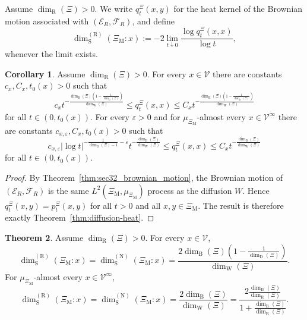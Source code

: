 \documentclass{article}
\theoremstyle{plain}
\theoremstyle{definition}
\newtheorem{theorem}{Theorem}[section]
\newtheorem{corollary}[theorem]{Corollary}
\newcommand{\dimbox}{\dim_\mathrm{B}}
\newcommand{\dimdeg}{\dim_\mathrm{D}}
\newcommand{\dimwalk}{\dim_\mathrm{W}}
\newcommand{\dimresis}{\dim_\mathrm{R}}
\newcommand{\dimspec}{\dim_\mathrm{S}}
\begin{document}

\bigskip 

Assume $\dimresis(\Xi)>0$.
We write $q_t^\Xi(x,y)$ for the heat kernel of the Brownian motion associated with $(\mathcal E_R,\mathcal F_R)$, and define
\[
\dimspec^{(\mathrm R)}(\Xi_{\mathrm M}:x)
:=
-2 \lim_{t \downarrow 0} \frac{\log q_t^\Xi(x,x)}{\log t},
\]
whenever the limit exists.

\begin{corollary}\label{cor:brownian-heat}
Assume $\dimresis(\Xi)>0$.
For every $x\in \mathscr V$ there are constants $c_x,C_x,t_0(x)>0$ such that
\[
c_x t^{-\frac{\dimbox(\Xi)\left(1-\frac{1}{\dimdeg(\Xi)}\right)}{\dimwalk(\Xi)}}
\le
q_t^\Xi(x,x)
\le
C_x t^{-\frac{\dimbox(\Xi)\left(1-\frac{1}{\dimdeg(\Xi)}\right)}{\dimwalk(\Xi)}}
\]
for all $t\in(0,t_0(x))$.
For every $\varepsilon>0$ and for $\mu_{\Xi_{\mathrm M}}$-almost every $x\in \mathscr V^\infty$ there are constants $c_{x,\varepsilon},C_x,t_0(x)>0$ such that
\[
c_{x,\varepsilon} |\log t|^{-\frac{1}{\dimdeg(\Xi)-1}-\varepsilon} t^{-\frac{\dimbox(\Xi)}{\dimwalk(\Xi)}}
\le
q_t^\Xi(x,x)
\le
C_x t^{-\frac{\dimbox(\Xi)}{\dimwalk(\Xi)}}
\]
for all $t\in(0,t_0(x))$.
\end{corollary}

\begin{proof}
By Theorem~\ref{thm:sec32_brownian_motion}, the Brownian motion of $(\mathcal E_R,\mathcal F_R)$ is the same $L^2(\Xi_{\mathrm M},\mu_{\Xi_{\mathrm M}})$ process as the diffusion $W$.
Hence $q_t^\Xi(x,y)=p_t^\Xi(x,y)$ for all $t>0$ and all $x,y\in \Xi_{\mathrm M}$.
The result is therefore exactly Theorem~\ref{thm:diffusion-heat}.
\end{proof}

\begin{theorem}\label{thm:brownian-spectral}
Assume $\dimresis(\Xi)>0$.
For every $x\in \mathscr V$,
\[
\dimspec^{(\mathrm R)}(\Xi_{\mathrm M}:x)
=
\dimspec^{(\mathrm N)}(\Xi_{\mathrm M}:x)
=
\frac{2\dimbox(\Xi)\left(1-\frac{1}{\dimdeg(\Xi)}\right)}{\dimwalk(\Xi)}.
\]
For $\mu_{\Xi_{\mathrm M}}$-almost every $x\in \mathscr V^\infty$,
\[
\dimspec^{(\mathrm R)}(\Xi_{\mathrm M}:x)
=
\dimspec^{(\mathrm N)}(\Xi_{\mathrm M}:x)
=
\frac{2\dimbox(\Xi)}{\dimwalk(\Xi)}
=
\frac{2\frac{\dimbox(\Xi)}{\dimresis(\Xi)}}{1+\frac{\dimbox(\Xi)}{\dimresis(\Xi)}}.
\]
\end{theorem}
\end{document}
